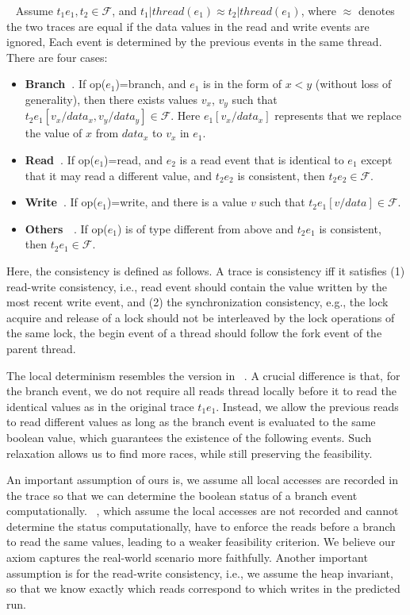 \begin{myaxiom}~\label{axiom:local}
Assume $t_1e_1, t_2 \in \mathcal{F}$, and $t_1|thread(e_1)\approx t_2|thread(e_1)$, where $\approx$ denotes the two traces are equal if the data values in the read and write events are ignored, 
Each event is determined by the previous events in the same thread. There are four cases:
\begin{itemize}
\item {\bf Branch\ }. If op($e_1$)=branch, and $e_1$ is in the form of $x<y$ (without loss of generality), then there exists values $v_x$, $v_y$ such that $t_2 e_1 [v_x/data_x, v_y/data_y] \in \mathcal{F}$. Here $e_1 [v_x/data_x]$ represents that we replace the value of $x$ from $data_x$ to $v_x$ in $e_1$.
\item {\bf Read\ }. If op($e_1$)=read, and $e_2$ is a read event that is identical to $e_1$ except that it may read a different value, and $t_2 e_2$ is consistent, then $t_2 e_2 \in \mathcal{F}$.
\item {\bf Write\ }. If op($e_1$)=write, and there is a value $v$ such that $t_2 e_1[v/data]\in \mathcal{F}$. 
\item {\bf Others \ }. If op($e_1$) is of type different from above and $t_2 e_1$ is consistent, then $t_2 e_1 \in \mathcal{F}$.
\end{itemize}

Here, the consistency is defined as follows. 
A trace is consistency iff it satisfies (1) read-write consistency, i.e., read event should contain the value written by the most recent write event, and (2) the synchronization consistency, e.g., the lock acquire and release of a lock should not be interleaved by the lock operations of the same lock, the begin event of a thread should follow the fork event of the parent thread.
\end{myaxiom}

The local determinism resembles the version in ~\cite{pldi14,maximal}. A crucial difference is that, for the branch event, we do not require all reads thread locally before it to read the identical values as in the original trace $t_1 e_1$. Instead, we allow the previous reads to read different values as long as the branch event is evaluated to the same boolean value, which guarantees the existence of the following events. Such relaxation allows us to find more races, while still preserving the feasibility. 


An important assumption of ours is, we assume all local accesses are recorded in the trace so that we can determine the boolean status of a branch event computationally. ~\cite{pldi14}, which assume the local accesses are not recorded and cannot determine the status computationally, have to enforce the reads before a branch to read the same values, leading to a weaker feasibility criterion. We believe our axiom captures the real-world scenario more faithfully.
Another important assumption is for the read-write consistency, i.e., we assume the heap invariant, so that we know exactly which reads correspond to which writes in the predicted run.

